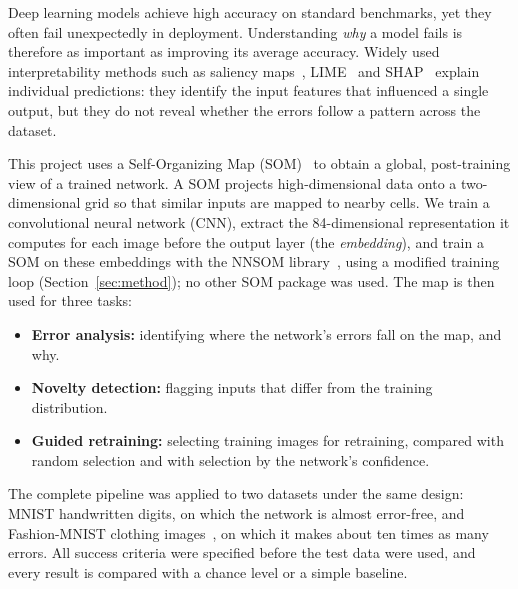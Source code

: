 \documentclass{scrartcl}
\begin{document}
Deep learning models achieve high accuracy on standard benchmarks, yet they often fail unexpectedly in deployment. Understanding \emph{why} a model fails is therefore as important as improving its average accuracy. Widely used interpretability methods such as saliency maps~\cite{simonyan2014saliency}, LIME~\cite{ribeiro2016lime} and SHAP~\cite{lundberg2017shap} explain individual predictions: they identify the input features that influenced a single output, but they do not reveal whether the errors follow a pattern across the dataset.

This project uses a Self-Organizing Map (SOM)~\cite{kohonen1990som} to obtain a global, post-training view of a trained network. A SOM projects high-dimensional data onto a two-dimensional grid so that similar inputs are mapped to nearby cells. We train a convolutional neural network (CNN), extract the 84-dimensional representation it computes for each image before the output layer (the \emph{embedding}), and train a SOM on these embeddings with the NNSOM library~\cite{jafari_nnsom}, using a modified training loop (Section~\ref{sec:method}); no other SOM package was used. The map is then used for three tasks:
\begin{itemize}
  \item \textbf{Error analysis:} identifying where the network's errors fall on the map, and why.
  \item \textbf{Novelty detection:} flagging inputs that differ from the training distribution.
  \item \textbf{Guided retraining:} selecting training images for retraining, compared with random selection and with selection by the network's confidence.
\end{itemize}

The complete pipeline was applied to two datasets under the same design: MNIST handwritten digits, on which the network is almost error-free, and Fashion-MNIST clothing images~\cite{xiao2017fashion}, on which it makes about ten times as many errors. All success criteria were specified before the test data were used, and every result is compared with a chance level or a simple baseline.
\end{document}

